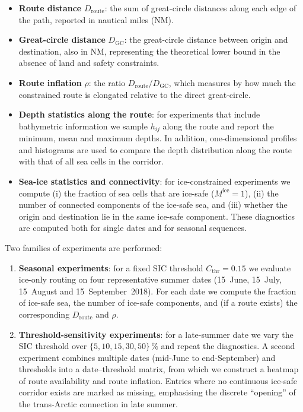 \begin{itemize}
  \item \textbf{Route distance} $D_{\mathrm{route}}$:
    the sum of great-circle distances along each edge of the path,
    reported in nautical miles (NM).

  \item \textbf{Great-circle distance} $D_{\mathrm{GC}}$:
    the great-circle distance between origin and destination, also in
    NM, representing the theoretical lower bound in the absence of
    land and safety constraints.

  \item \textbf{Route inflation} $\rho$:
    the ratio $D_{\mathrm{route}}/D_{\mathrm{GC}}$, which measures by how
    much the constrained route is elongated relative to the direct
    great-circle.

  \item \textbf{Depth statistics along the route}:
    for experiments that include bathymetric information we sample
    $h_{ij}$ along the route and report the minimum, mean and maximum
    depths. In addition, one-dimensional profiles and histograms are
    used to compare the depth distribution along the route with that of
    all sea cells in the corridor.

  \item \textbf{Sea-ice statistics and connectivity}:
    for ice-constrained experiments we compute (i) the fraction of sea
    cells that are ice-safe ($M^{\mathrm{ice}}=1$), (ii) the number of
    connected components of the ice-safe sea, and (iii) whether the
    origin and destination lie in the same ice-safe component. These
    diagnostics are computed both for single dates and for seasonal
    sequences.
\end{itemize}

Two families of experiments are performed:

\begin{enumerate}
  \item \textbf{Seasonal experiments}:
    for a fixed SIC threshold $C_{\mathrm{thr}}=0.15$ we evaluate
    ice-only routing on four representative summer dates
    (15~June, 15~July, 15~August and 15~September~2018). For each date
    we compute the fraction of ice-safe sea, the number of ice-safe
    components, and (if a route exists) the corresponding
    $D_{\mathrm{route}}$ and $\rho$.

  \item \textbf{Threshold-sensitivity experiments}:
    for a late-summer date we vary the SIC
    threshold over $\{5, 10, 15, 30, 50\}\,\%$ and repeat the
    diagnostics. A second experiment combines multiple dates
    (mid-June to end-September) and thresholds into a date--threshold
    matrix, from which we construct a heatmap of route availability and
    route inflation. Entries where no continuous ice-safe corridor
    exists are marked as missing, emphasising the discrete ``opening''
    of the trans-Arctic connection in late summer.
\end{enumerate}

